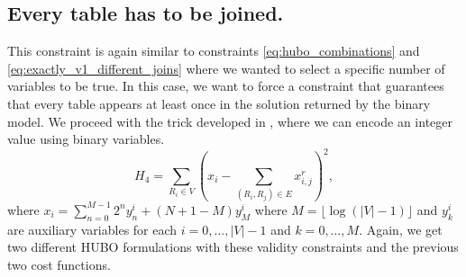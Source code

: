 \subsection{Every table has to be joined.}
This constraint is again similar to constraints \eqref{eq:hubo_combinations} and \eqref{eq:exactly_v1_different_joins} where we wanted to select a specific number of variables to be true. In this case, we want to force a constraint that guarantees that every table appears at least once in the solution returned by the binary model. We proceed with the trick developed in \cite{lucas}, where we can encode an integer value using binary variables.
\begin{equation}\label{eq:every_table_joined_once}
    H_4 = \sum_{R_i \in V} \left( x_{i} - \sum_{(R_i, R_j) \in E} x_{i,j}^{r} \right)^2,
\end{equation}
where $x_i = \sum_{n = 0}^{M - 1}2^n y^{i}_{n} + (N + 1 - M)y_{M}^{i}$ where $M = \lfloor \log(|V| - 1) \rfloor$ and $y_{k}^{i}$ are auxiliary variables for each $i = 0, \ldots, |V| - 1$ and $k = 0, \ldots, M$. Again, we get two different HUBO formulations with these validity constraints and the previous two cost functions.